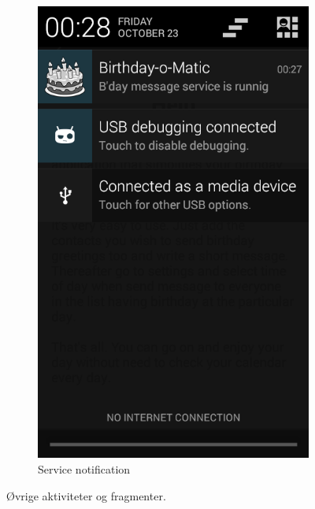 \begin{figure}[ht]
\begin{subfigure}[b]{0.35\textwidth}
        \includegraphics[width=\textwidth]{./img/10.png}
        \caption{Service notification}
        \label{fig:notification}
    \end{subfigure}
    \caption{Øvrige aktiviteter og fragmenter.}
    \label{fig:ovrige_aktiviteter}
\end{figure}


